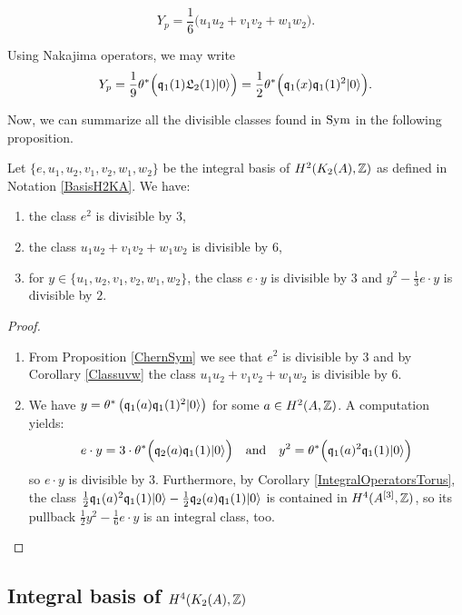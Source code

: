 \begin{corollary}\label{Classuvw}
\begin{equation} \label{YSym}
Y_p =  \frac{1}{6}\Big(u_1u_2 + v_1v_2 +  w_1 w_2 \Big).
\end{equation}
\end{corollary}
\begin{remark}\label{afterClassuvw}
Using Nakajima operators, we may write
\begin{gather}
Y_p = \frac{1}{9} \theta^*\Big( \mathfrak{q}_1(1)\mathfrak L_2(1) |0\rangle \Big) =  \frac{1}{2}\theta^*\Big(\mathfrak{q}_1(x)\mathfrak{q}_1(1)^2|0\rangle\Big).
\end{gather}
\end{remark}
Now, we can summarize all the divisible classes found in $\operatorname{Sym}$ in the following proposition. 
\begin{proposition}\label{classedivisibleSym}
Let $\{e,u_1,u_2,v_1,v_2,w_1,w_2\}$ be the integral basis of $H^2(K_{ 2 }( A ),\mathbb{Z})$ as defined in Notation \ref{BasisH2KA}. 
We have:
\begin{enumerate}
\item
the class $e^2$ is divisible by $3$, 
\item
the class $u_1u_2 + v_1v_2+w_1w_2$ is divisible by 6,
\item
for $y\in\{u_1,u_2,v_1,v_2,w_1,w_2\}$, the class 
$
e \cdot y
$
is divisible by $3$ and 
$
 y^2 - \frac{1}{3} e\cdot y
$
is divisible by $2$.
\end{enumerate}
\end{proposition}
\begin{proof}
\begin{enumerate}
\item
From Proposition \ref{ChernSym} we see that
$e^2$ is divisible by $3$ and by Corollary \ref{Classuvw}
the class $u_1u_2 + v_1v_2+w_1w_2$ is divisible by 6.
\item
We have $y= \theta^*\left(\mathfrak{q}_1(a)\mathfrak{q}_1(1)^2|0\rangle\right)$ for some $a\in H^2(A,\mathbb{Z})$. A computation yields:
$$
e\cdot y = 3\cdot \theta^*\Big( \mathfrak{q}_2(a)\mathfrak{q}_1(1)|0\rangle \Big)
\quad \text{and}\quad
y^2 = \theta^*\Big(\mathfrak{q}_1(a)^2\mathfrak{q}_1(1)|0\rangle\Big)
$$
so $e\cdot y$ is divisible by $3$. Furthermore, by Corollary \ref{IntegralOperatorsTorus}, the class 
$
\frac{1}{2} \mathfrak{q}_1(a)^2\mathfrak{q}_1(1)|0\rangle - \frac{1}{2} \mathfrak{q}_2(a)\mathfrak{q}_1(1)|0\rangle 
$
is contained in $H^4(A^{[3]},\mathbb{Z})$, so its pullback
$
 \frac{1}{2}y^2 - \frac{1}{6} e\cdot y
$
is an integral class, too.
\end{enumerate}
\end{proof}
\subsection{Integral basis of $H^4(K_2(A),\mathbb{Z})$}\label{integralbasisH4}

